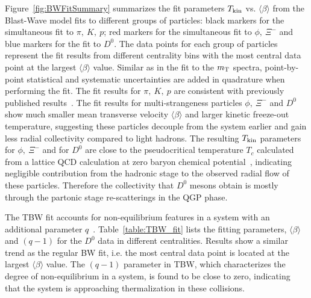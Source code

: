 \documentclass[%
 reprint,	
 amsmath,amssymb,
 aps,
 prc,
]{revtex4-1}
\begin{document}
Figure~\ref{fig:BWFitSummary} summarizes the fit parameters $T_{\rm kin}$ vs. $\langle\beta\rangle$ from the Blast-Wave model fits to different groups of particles: black markers for the simultaneous fit to $\pi,\ K,\ p$; red markers for the simultaneous fit to $\phi,\ \Xi^-$ and blue markers for the fit to $D^0$. The data points for each group of particles represent the fit results from different centrality bins with the most central data point at the largest $\langle\beta\rangle$ value. Similar as in the fit to the $m_{\rm T}$ spectra, point-by-point statistical and systematic uncertainties are added in quadrature when performing the fit. The fit results for $\pi,\ K,\ p$ are consistent with previously published results~\cite{Tang:2008ud}. The fit results for multi-strangeness particles $\phi,\ \Xi^{-}$ and $D^0$ show much smaller mean transverse velocity $\langle\beta\rangle$ and larger kinetic freeze-out temperature, suggesting these particles decouple from the system earlier and gain less radial collectivity compared to light hadrons. The resulting $T_{\rm kin}$ parameters for $\phi,\ \Xi^-$ and for $D^0$ are close to the pseudocritical temperature $T_{c}$ calculated from a lattice QCD calculation at zero baryon chemical potential~\cite{Bazavov:2011nk}, indicating negligible contribution from the hadronic stage to the observed radial flow of these particles. Therefore the collectivity that $D^0$ mesons obtain is mostly through the partonic stage re-scatterings in the QGP phase. 

The TBW fit accounts for non-equilibrium features in a system with an additional parameter $q$~\cite{Tang:2008ud}. Table~\ref{table:TBW_fit} lists the fitting parameters, $\langle\beta\rangle$ and $(q-1)$ for the $D^0$ data in different centralities. Results show a similar trend as the regular BW fit, i.e. the most central data point is located at the largest $\langle\beta\rangle$ value. The $(q-1)$ parameter in TBW, which characterizes the degree of non-equilibrium in a system, is found to be close to zero, indicating that the system is approaching thermalization in these collisions.
\end{document}
